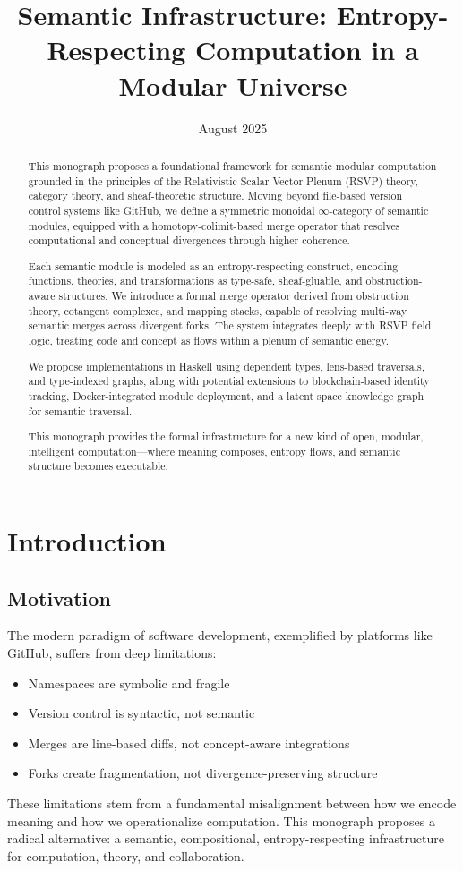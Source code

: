 \documentclass[12pt]{article}
\title{Semantic Infrastructure: Entropy-Respecting Computation in a Modular Universe}
\author{}
\date{August 2025}
\begin{document}
\maketitle

\begin{abstract}
This monograph proposes a foundational framework for semantic modular computation grounded in the principles of the Relativistic Scalar Vector Plenum (RSVP) theory, category theory, and sheaf-theoretic structure. Moving beyond file-based version control systems like GitHub, we define a symmetric monoidal $\infty$-category of semantic modules, equipped with a homotopy-colimit-based merge operator that resolves computational and conceptual divergences through higher coherence.

Each semantic module is modeled as an entropy-respecting construct, encoding functions, theories, and transformations as type-safe, sheaf-gluable, and obstruction-aware structures. We introduce a formal merge operator derived from obstruction theory, cotangent complexes, and mapping stacks, capable of resolving multi-way semantic merges across divergent forks. The system integrates deeply with RSVP field logic, treating code and concept as flows within a plenum of semantic energy.

We propose implementations in Haskell using dependent types, lens-based traversals, and type-indexed graphs, along with potential extensions to blockchain-based identity tracking, Docker-integrated module deployment, and a latent space knowledge graph for semantic traversal.

This monograph provides the formal infrastructure for a new kind of open, modular, intelligent computation—where meaning composes, entropy flows, and semantic structure becomes executable.
\end{abstract}

\section*{Introduction}
\subsection*{Motivation}
The modern paradigm of software development, exemplified by platforms like GitHub, suffers from deep limitations:
\begin{itemize}
    \item Namespaces are symbolic and fragile
    \item Version control is syntactic, not semantic
    \item Merges are line-based diffs, not concept-aware integrations
    \item Forks create fragmentation, not divergence-preserving structure
\end{itemize}
These limitations stem from a fundamental misalignment between how we encode meaning and how we operationalize computation. This monograph proposes a radical alternative: a semantic, compositional, entropy-respecting infrastructure for computation, theory, and collaboration.
\end{document}
